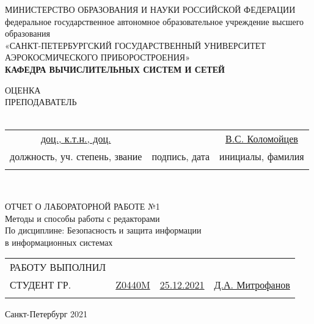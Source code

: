 \documentclass[a4paper]{article}
\begin{document}
\begin{center}
\hfill \break
\small{МИНИСТЕРСТВО ОБРАЗОВАНИЯ И НАУКИ РОССИЙСКОЙ ФЕДЕРАЦИИ}\\
\footnotesize{федеральное государственное автономное образовательное учреждение высшего}\\ 
\footnotesize{образования}\\
\small{«САНКТ-ПЕТЕРБУРГСКИЙ ГОСУДАРСТВЕННЫЙ УНИВЕРСИТЕТ АЭРОКОСМИЧЕСКОГО ПРИБОРОСТРОЕНИЯ»}\\
\hfill \break
\small{\textbf{КАФЕДРА ВЫЧИСЛИТЕЛЬНЫХ СИСТЕМ И СЕТЕЙ}}\\
\hfill \break
\hfill \break
\hfill \break
\hfill \break
\end{center}
\normalsize{ОЦЕНКА\\
ПРЕПОДАВАТЕЛЬ}\\\\
\begin{tabular}{c c c}
\underline{\hspace{0.8cm}доц., к.т.н., доц.\hspace{0.8cm}} & \underline{\hspace{1cm} \phantom{ц baseline hack} } & \underline{\hspace{0.8cm}В.С. Коломойцев\hspace{0.8cm}} \\
\hfill\break
\footnotesize{должность, уч. степень, звание} & \footnotesize{подпись, дата} & \footnotesize{инициалы, фамилия}\\\\
\end{tabular}\\
\hfill \break
\hfill \break
\begin{center}
\normalsize{ОТЧЕТ О ЛАБОРАТОРНОЙ РАБОТЕ №1\\
\hfill \break
Методы и способы работы с редакторами\\
\hfill \break
По дисциплине: Безопасность и защита информации\\
в информационных системах}\\
\hfill \break
\hfill \break
\end{center}
\begin{tabular}{l c c c}
РАБОТУ ВЫПОЛНИЛ\\
СТУДЕНТ ГР. & \ul{  Z0440M  } & \ul{  25.12.2021  } & \underline{\hspace{0.4cm}Д.А. Митрофанов\hspace{0.4cm}}\\
\hfill\break
\end{tabular}\hfill \break
\hfill \break
\hfill \break
\hfill \break
\hfill \break
\hfill \break
\begin{center}Санкт-Петербург 2021 \end{center}
\thispagestyle{empty}
\newpage
\end{document}
